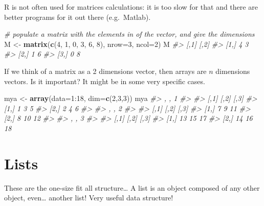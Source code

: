 \documentclass[]{book}
\newenvironment{Shaded}{}{}
\newcommand{\CommentTok}[1]{\textcolor[rgb]{0.38,0.63,0.69}{\textit{#1}}}
\newcommand{\DataTypeTok}[1]{\textcolor[rgb]{0.56,0.13,0.00}{#1}}
\newcommand{\DecValTok}[1]{\textcolor[rgb]{0.25,0.63,0.44}{#1}}
\newcommand{\KeywordTok}[1]{\textcolor[rgb]{0.00,0.44,0.13}{\textbf{#1}}}
\newcommand{\NormalTok}[1]{#1}
\newcommand{\OperatorTok}[1]{\textcolor[rgb]{0.40,0.40,0.40}{#1}}
\newcommand{\StringTok}[1]{\textcolor[rgb]{0.25,0.44,0.63}{#1}}
\theoremstyle{definition}
\theoremstyle{definition}
\theoremstyle{definition}
\theoremstyle{remark}
\begin{document}
R is not often used for matrices calculations: it is too slow for that
and there are better programs for it out there (e.g.~Matlab).

\begin{Shaded}
\begin{Highlighting}[]
\CommentTok{# populate a matrix with the elements in of the vector, and give the dimensions}
\NormalTok{M <-}\StringTok{ }\KeywordTok{matrix}\NormalTok{(}\KeywordTok{c}\NormalTok{(}\DecValTok{4}\NormalTok{, }\DecValTok{1}\NormalTok{, }\DecValTok{0}\NormalTok{, }\DecValTok{3}\NormalTok{, }\DecValTok{6}\NormalTok{, }\DecValTok{8}\NormalTok{), }\DataTypeTok{nrow=}\DecValTok{3}\NormalTok{, }\DataTypeTok{ncol=}\DecValTok{2}\NormalTok{) }
\NormalTok{M}
\CommentTok{#>      [,1] [,2]}
\CommentTok{#> [1,]    4    3}
\CommentTok{#> [2,]    1    6}
\CommentTok{#> [3,]    0    8}
\end{Highlighting}
\end{Shaded}

If we think of a matrix as a 2 dimensions vector, then arrays are \(n\)
dimensions vectors. Is it important? It might be in some very specific
cases.

\begin{Shaded}
\begin{Highlighting}[]
\NormalTok{mya <-}\StringTok{ }\KeywordTok{array}\NormalTok{(}\DataTypeTok{data=}\DecValTok{1}\OperatorTok{:}\DecValTok{18}\NormalTok{, }\DataTypeTok{dim=}\KeywordTok{c}\NormalTok{(}\DecValTok{2}\NormalTok{,}\DecValTok{3}\NormalTok{,}\DecValTok{3}\NormalTok{))}
\NormalTok{mya}
\CommentTok{#> , , 1}
\CommentTok{#> }
\CommentTok{#>      [,1] [,2] [,3]}
\CommentTok{#> [1,]    1    3    5}
\CommentTok{#> [2,]    2    4    6}
\CommentTok{#> }
\CommentTok{#> , , 2}
\CommentTok{#> }
\CommentTok{#>      [,1] [,2] [,3]}
\CommentTok{#> [1,]    7    9   11}
\CommentTok{#> [2,]    8   10   12}
\CommentTok{#> }
\CommentTok{#> , , 3}
\CommentTok{#> }
\CommentTok{#>      [,1] [,2] [,3]}
\CommentTok{#> [1,]   13   15   17}
\CommentTok{#> [2,]   14   16   18}
\end{Highlighting}
\end{Shaded}

\hypertarget{lists}{%
\section{Lists}\label{lists}}

These are the one-size fit all structure\ldots{} A list is an object
composed of any other object, even\ldots{} another list! Very useful
data structure!
\end{document}
